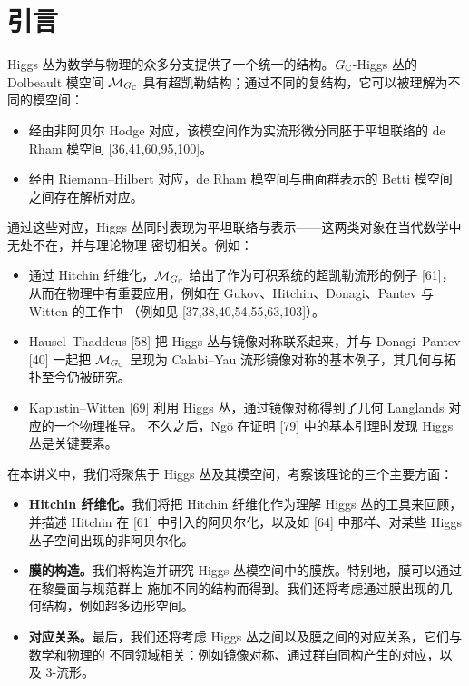 
\section{引言}

Higgs 丛为数学与物理的众多分支提供了一个统一的结构。$G_{\mathbb{C}}$-Higgs 丛的 Dolbeault 模空间
$\mathcal{M}_{G_{\mathbb{C}}}$ 具有超凯勒结构；通过不同的复结构，它可以被理解为不同的模空间：
\begin{itemize}[leftmargin=1.4em,itemsep=1pt,topsep=2pt]
\item 经由非阿贝尔 Hodge 对应，该模空间作为实流形微分同胚于平坦联络的 de Rham 模空间
  [36,41,60,95,100]。
\item 经由 Riemann--Hilbert 对应，de Rham 模空间与曲面群表示的 Betti 模空间之间存在解析对应。
\end{itemize}

通过这些对应，Higgs 丛同时表现为平坦联络与表示——这两类对象在当代数学中无处不在，并与理论物理
密切相关。例如：
\begin{itemize}[leftmargin=1.4em,itemsep=1pt,topsep=2pt]
\item 通过 Hitchin 纤维化，$\mathcal{M}_{G_{\mathbb{C}}}$ 给出了作为可积系统的超凯勒流形的例子 [61]，
  从而在物理中有重要应用，例如在 Gukov、Hitchin、Donagi、Pantev 与 Witten 的工作中
  （例如见 [37,38,40,54,55,63,103]）。
\item Hausel--Thaddeus [58] 把 Higgs 丛与镜像对称联系起来，并与 Donagi--Pantev [40] 一起把
  $\mathcal{M}_{G_{\mathbb{C}}}$ 呈现为 Calabi--Yau 流形镜像对称的基本例子，其几何与拓扑至今仍被研究。
\item Kapustin--Witten [69] 利用 Higgs 丛，通过镜像对称得到了几何 Langlands 对应的一个物理推导。
  不久之后，Ngô 在证明 [79] 中的基本引理时发现 Higgs 丛是关键要素。
\end{itemize}

在本讲义中，我们将聚焦于 Higgs 丛及其模空间，考察该理论的三个主要方面：
\begin{itemize}[leftmargin=1.4em,itemsep=1pt,topsep=2pt]
\item \textbf{Hitchin 纤维化。}我们将把 Hitchin 纤维化作为理解 Higgs 丛的工具来回顾，并描述
  Hitchin 在 [61] 中引入的阿贝尔化，以及如 [64] 中那样、对某些 Higgs 丛子空间出现的非阿贝尔化。
\item \textbf{膜的构造。}我们将构造并研究 Higgs 丛模空间中的膜族。特别地，膜可以通过在黎曼面与规范群上
  施加不同的结构而得到。我们还将考虑通过膜出现的几何结构，例如超多边形空间。
\item \textbf{对应关系。}最后，我们还将考虑 Higgs 丛之间以及膜之间的对应关系，它们与数学和物理的
  不同领域相关：例如镜像对称、通过群自同构产生的对应，以及 3-流形。
\end{itemize}

